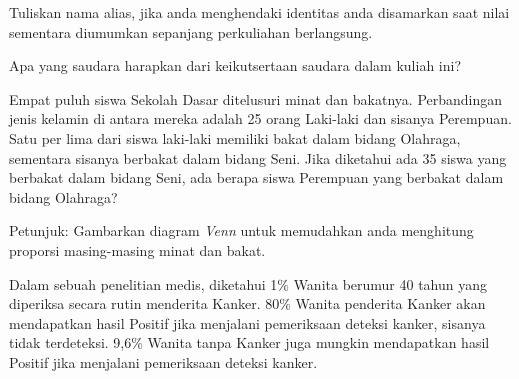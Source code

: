 \documentclass[a4paper,12pt,answers]{exam}
\begin{document}
\begin{questions}
  \question Tuliskan nama alias, jika anda menghendaki identitas anda disamarkan saat nilai sementara diumumkan sepanjang perkuliahan berlangsung.
  
  
	\question[10] Apa yang saudara harapkan dari keikutsertaan saudara dalam kuliah ini?
	\begin{solution}
		\vspace{5.0cm}
	\end{solution}
	
	
	\question[10] \label{ques:minat-siswa} Empat puluh siswa Sekolah Dasar ditelusuri minat dan bakatnya. Perbandingan jenis kelamin di antara mereka adalah 25 orang Laki-laki dan sisanya Perempuan. Satu per lima dari siswa laki-laki memiliki bakat dalam bidang Olahraga, sementara sisanya berbakat dalam bidang Seni. Jika diketahui ada 35 siswa yang berbakat dalam bidang Seni, ada berapa siswa Perempuan yang berbakat dalam bidang Olahraga?
	
	Petunjuk: Gambarkan diagram \emph{Venn} untuk memudahkan anda menghitung proporsi masing-masing minat dan bakat.
	\begin{solution}
	  \vspace{5.0cm}
	\end{solution}
	
	
	\question[10] \label{ques:probabilitas-minat-siswa} 
	
	
	\question[10] Dalam sebuah penelitian medis, diketahui 1\% Wanita berumur 40 tahun yang diperiksa secara rutin menderita Kanker. 80\% Wanita penderita Kanker akan mendapatkan hasil Positif jika menjalani pemeriksaan deteksi kanker, sisanya tidak terdeteksi. 9,6\% Wanita tanpa Kanker juga mungkin mendapatkan hasil Positif jika menjalani pemeriksaan deteksi kanker.
	

\end{questions}
\end{document}
